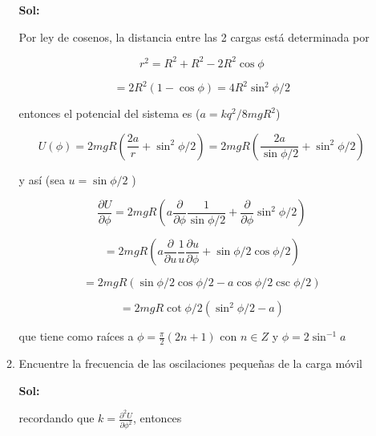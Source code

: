 \documentclass[12pt,a4paper]{article}
\begin{document}
\begin{enumerate}
\begin{enumerate}
    \textbf{Sol:}
    
    Por ley de cosenos, la distancia entre las 2 cargas está determinada por
    
    \begin{equation*}
        r^2 = R^2 + R^2 - 2R^2 \cos{\phi} 
    \end{equation*}
    
    \begin{equation*}
        = 2R^2 (1 - \cos{\phi}) = 4 R^2 \sin^2{\phi/2}
    \end{equation*}
    
    entonces el potencial del sistema es ($a = kq^2/8mgR^2$)
    
    \begin{equation*}
        U(\phi) = 2mgR \left(\frac{2a}{r} +\sin^2{\phi/2}\right) =2mgR\left( \frac{2a}{\sin{\phi/2}} +\sin^2{\phi/2}\right)
    \end{equation*}
    
    y así (sea $u = \sin{\phi/2}$ )
    
    \begin{equation*}
        \frac{\partial U}{\partial \phi} =2mgR\left(  a \frac{\partial}{\partial \phi}  \frac{1}{\sin{\phi/2}} + \frac{\partial }{\partial \phi} \sin^2{\phi/2}\right)
    \end{equation*}
    
    \begin{equation*}
        = 2mgR \left( a\frac{\partial}{\partial u} \frac{1}{u} \frac{\partial u}{\partial \phi} + \sin{\phi/2} \cos{\phi/2} \right)
    \end{equation*}
    
    \begin{equation*}
        =2mgR \left(\sin{\phi/2} \cos{\phi/2}-a \cos{\phi/2} \csc{\phi/2} \right)
    \end{equation*}
    
    \begin{equation*}
        =2mgR \cot{\phi/2}\left(\sin^2{\phi/2} - a \right)
    \end{equation*}
    
    que tiene como raíces a $\phi = \frac{\pi}{2} (2n+1)$ con $n \in  Z$ y $\phi = 2\sin^{-1}{a}$
    
    \item Encuentre la frecuencia de las oscilaciones pequeñas de la carga móvil
    
    \textbf{Sol:}
    
    recordando que $k = \frac{\partial^2 U}{\partial \phi^2}$, entonces
    

\end{enumerate}
\end{enumerate}
\end{document}
